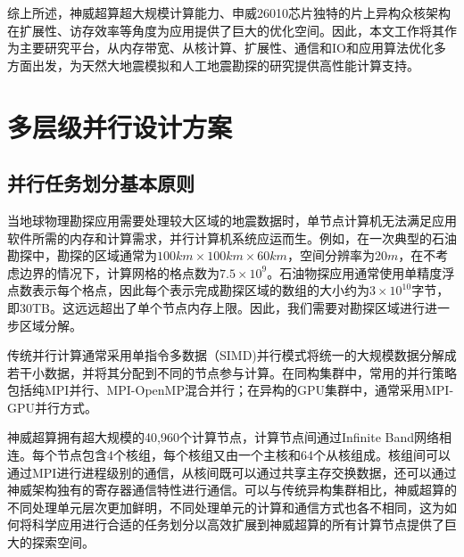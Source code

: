 综上所述，神威超算超大规模计算能力、申威26010芯片独特的片上异构众核架构在扩展性、访存效率等角度为应用提供了巨大的优化空间。因此，本文工作将其作为主要研究平台，从内存带宽、从核计算、扩展性、通信和IO和应用算法优化多方面出发，为天然大地震模拟和人工地震勘探的研究提供高性能计算支持。

\section{多层级并行设计方案}
\label{sec:多层级并行设计方案}

\subsection{并行任务划分基本原则}

当地球物理勘探应用需要处理较大区域的地震数据时，单节点计算机无法满足应用软件所需的内存和计算需求，并行计算机系统应运而生。例如，在一次典型的石油勘探中，勘探的区域通常为$100km\times100km\times60km$，空间分辨率为$20m$，在不考虑边界的情况下，计算网格的格点数为$7.5\times10^9$。石油物探应用通常使用单精度浮点数表示每个格点，因此每个表示完成勘探区域的数组的大小约为$3\times10^10$字节，即30TB。这远远超出了单个节点内存上限。因此，我们需要对勘探区域进行进一步区域分解。

传统并行计算通常采用单指令多数据（SIMD)并行模式将统一的大规模数据分解成若干小数据，并将其分配到不同的节点参与计算。在同构集群中，常用的并行策略包括纯MPI并行、MPI-OpenMP混合并行；在异构的GPU集群中，通常采用MPI-GPU并行方式。

神威超算拥有超大规模的40,960个计算节点，计算节点间通过Infinite Band网络相连。每个节点包含4个核组，每个核组又由一个主核和64个从核组成。核组间可以通过MPI进行进程级别的通信，从核间既可以通过共享主存交换数据，还可以通过神威架构独有的寄存器通信特性进行通信。可以与传统异构集群相比，神威超算的不同处理单元层次更加鲜明，不同处理单元的计算和通信方式也各不相同，这为如何将科学应用进行合适的任务划分以高效扩展到神威超算的所有计算节点提供了巨大的探索空间。

